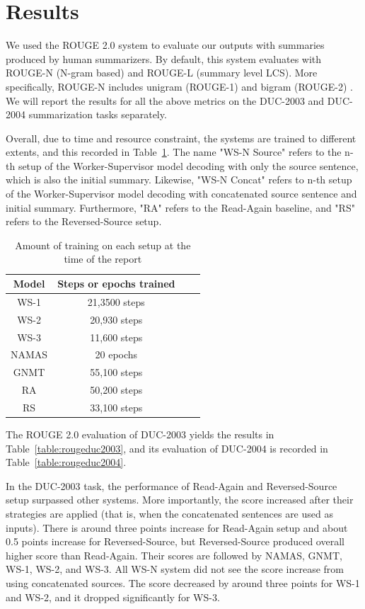 \documentclass[letterpaper]{article} %
\begin{document}
\section{Results}
We used the ROUGE 2.0 system \cite{ganesan2015rouge} to evaluate our outputs with summaries produced by human summarizers. By default, this system evaluates with ROUGE-N (N-gram based) and ROUGE-L (summary level LCS). More specifically, ROUGE-N includes unigram (ROUGE-1) and bigram (ROUGE-2) . We will report the results for all the above metrics on the DUC-2003 and DUC-2004 summarization tasks separately.

Overall, due to time and resource constraint, the systems are trained to different extents, and this recorded in Table~\ref{table:trainingsteps}. The name "WS-N Source" refers to the n-th setup of the Worker-Supervisor model decoding with only the source sentence, which is also the initial summary. Likewise, "WS-N Concat" refers to n-th setup of the Worker-Supervisor model decoding with concatenated source sentence and initial summary. Furthermore, "RA" refers to the Read-Again baseline, and "RS" refers to the Reversed-Source setup.

\begin{table}[h]
	\centering
	\begin{tabular}{c c c c}
		Model & Steps or epochs trained \\
		\hline
		WS-1 & 21,3500 steps \\
		WS-2 & 20,930 steps \\
		WS-3 & 11,600 steps \\
		\hline
		NAMAS & 20 epochs \\
		GNMT & 55,100 steps \\
		RA & 50,200 steps \\
		RS &  33,100 steps \\
	\end{tabular}
	\caption{Amount of training on each setup at the time of the report}
	\label{table:trainingsteps}
\end{table}

The ROUGE 2.0 evaluation of DUC-2003 yields the results in Table~\ref{table:rougeduc2003}, and its evaluation of DUC-2004 is recorded in Table~\ref{table:rougeduc2004}.

In the DUC-2003 task, the performance of Read-Again and Reversed-Source setup surpassed other systems. More importantly, the score increased after their strategies are applied (that is, when the concatenated sentences are used as inputs). There is around three points increase for Read-Again setup and about 0.5 points increase for Reversed-Source, but Reversed-Source produced overall higher score than Read-Again. Their scores are followed by NAMAS, GNMT, WS-1, WS-2, and WS-3. All WS-N system did not see the score increase from using concatenated sources. The score decreased by around three points for WS-1 and WS-2, and it dropped significantly for WS-3.
\end{document}
